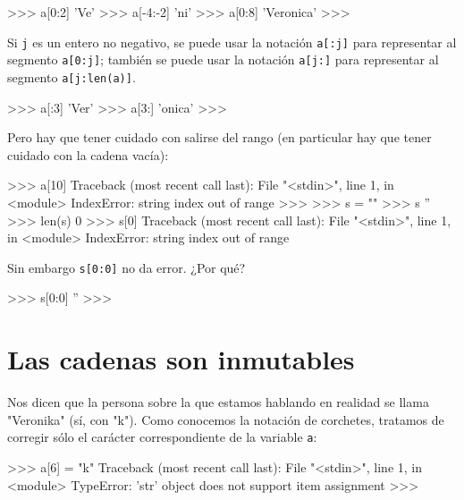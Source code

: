 \begin{codigo-python-sn}
>>> a[0:2]
'Ve'
>>> a[-4:-2]
'ni'
>>> a[0:8]
'Veronica'
>>>
\end{codigo-python-sn}

Si \lstinline!j! es un entero no negativo, se puede usar la notación
\lstinline+a[:j]+ para representar al segmento \lstinline+a[0:j]+; también
se puede usar la notación \lstinline+a[j:]+ para representar al segmento
\lstinline+a[j:len(a)]+.

\begin{codigo-python-sn}
>>> a[:3]
'Ver'
>>> a[3:]
'onica'
>>>
\end{codigo-python-sn}

Pero hay que tener cuidado con salirse del rango (en particular hay que
tener cuidado con la cadena vacía):

\begin{codigo-python-sn}
>>> a[10]
Traceback (most recent call last):
  File "<stdin>", line 1, in <module>
IndexError: string index out of range
>>>
>>> s = ""
>>> s
''
>>> len(s)
0
>>> s[0]
Traceback (most recent call last):
  File "<stdin>", line 1, in <module>
IndexError: string index out of range
\end{codigo-python-sn}

Sin embargo \lstinline+s[0:0]+ no da error. ¿Por qué?
\begin{codigo-python-sn}
>>> s[0:0]
''
>>>
\end{codigo-python-sn}



\section{Las cadenas son inmutables}

Nos dicen que la persona sobre la que estamos hablando en realidad se llama
"Veronika" (sí, con "k").  Como conocemos la notación de corchetes,
tratamos de corregir sólo el carácter correspondiente de la variable
\lstinline!a!:

\begin{codigo-python-sn}
>>> a[6] = "k"
Traceback (most recent call last):
  File "<stdin>", line 1, in <module>
TypeError: 'str' object does not support item assignment
>>>
\end{codigo-python-sn}

